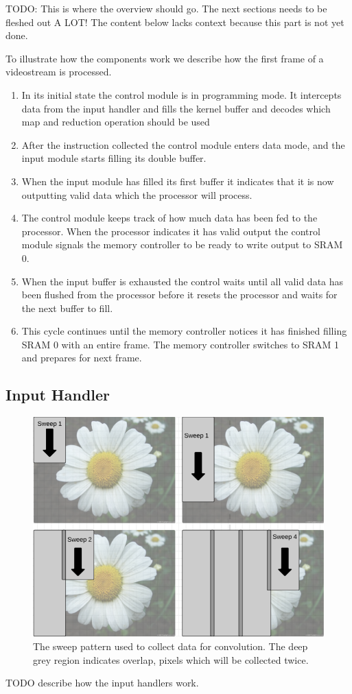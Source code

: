 TODO: This is where the overview should go. The next sections needs to be fleshed out A LOT!
The content below lacks context because this part is not yet done.

To illustrate how the components work we describe how the first frame of a videostream is processed.
\begin{enumerate}

    \item In its initial state the control module is in programming mode. It intercepts data from the input handler and fills the kernel buffer and decodes which map and reduction operation should be used
    \item After the instruction collected the control module enters data mode, and the input module starts filling its double buffer.
    \item When the input module has filled its first buffer it indicates that it is now outputting valid data which the processor will process.
    \item The control module keeps track of how much data has been fed to the processor. When the processor indicates it has valid output the control module signals the memory controller to be ready to write output to SRAM 0.
    \item When the input buffer is exhausted the control waits until all valid data has been flushed from the processor before it resets the processor and waits for the next buffer to fill.
    \item This cycle continues until the memory controller notices it has finished filling SRAM 0 with an entire frame. The memory controller switches to SRAM 1 and prepares for next frame.
\end{enumerate}

\subsection{Input Handler}
\begin{figure}[h!]
    \includegraphics[width=\linewidth]{img/Sweeps.png}
    \caption{The sweep pattern used to collect data for convolution. The deep grey region indicates overlap, pixels which will be collected twice.}
    \label{fig:Sweeps}
\end{figure}
TODO describe how the input handlers work.


